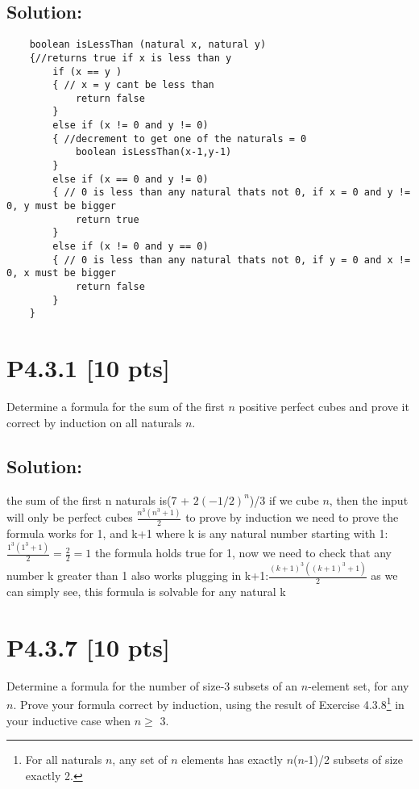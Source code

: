 \documentclass[12pt]{article}
\begin{document}
\subsection*{\textbf{Solution:}}
\begin{lstlisting}
    boolean isLessThan (natural x, natural y)
    {//returns true if x is less than y
        if (x == y )
        { // x = y cant be less than
            return false
        }
        else if (x != 0 and y != 0)
        { //decrement to get one of the naturals = 0
            boolean isLessThan(x-1,y-1)
        }
        else if (x == 0 and y != 0)
        { // 0 is less than any natural thats not 0, if x = 0 and y != 0, y must be bigger
            return true
        }
        else if (x != 0 and y == 0)
        { // 0 is less than any natural thats not 0, if y = 0 and x != 0, x must be bigger
            return false
        }
    }
    \end{lstlisting}


\newpage
\section*{\textbf{P4.3.1} [10 pts]}
Determine a formula for the sum of the first $n$ positive perfect cubes and prove it correct by induction on all naturals $n$.

\subsection*{\textbf{Solution:}}

the sum of the first n naturals is(7 + $2(-1/2)^n$)/3\newline
if we cube $n$, then the input will only be perfect cubes $\frac{n^3(n^3+1)}{2}$\newline
to prove by induction we need to prove the formula works for 1, and k+1 where k is any natural number \newline
starting with 1: $\frac{1^3(1^3+1)}{2} = \frac{2}{2} = 1$ the formula holds true for 1, now we need to check that any number k greater than 1 also works\newline
plugging in k+1:$\frac{(k+1)^3((k+1)^3+1)}{2}$ as we can simply see, this formula is solvable for any natural k
\newpage
\section*{\textbf{P4.3.7} [10 pts]}
Determine a formula for the number of size-3 subsets of an $n$-element set, for any $n$. Prove your formula correct by induction, using the result of Exercise 4.3.8\footnote{For all naturals $n$, any set of $n$ elements has exactly $n$($n$-1)/2 subsets of size exactly 2.} in your inductive case when $n \geq$ 3.
\end{document}
